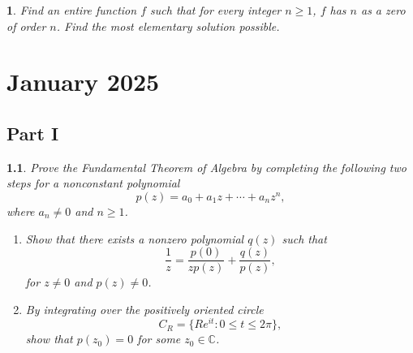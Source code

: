 \documentclass[12pt, a4paper]{report}
\theoremstyle{spaced}
\newtheorem{exercise}{}
\begin{document}
\begin{exercise}
	Find an entire function \(f\) such that for every integer \(n\ge 1\), \(f\) has
	\(n\) as a zero of order \(n\). Find the most elementary solution possible.
\end{exercise}

\chapter{January 2025}

\section{Part I}
\begin{exercise}
	Prove the Fundamental Theorem of Algebra by completing the following two
	steps for a nonconstant polynomial
	\[
		p(z)=a_0+a_1z+\cdots+a_nz^n,
	\]
	where \(a_n\neq 0\) and \(n\geq 1\).

	\begin{enumerate}
		\item[(a)] Show that there exists a nonzero polynomial \(q(z)\) such that
			\[
				\frac{1}{z}
				=
				\frac{p(0)}{zp(z)}
				+
				\frac{q(z)}{p(z)},
			\]
			for \(z\neq 0\) and \(p(z)\neq 0\).

		\item[(b)] By integrating over the positively oriented circle
			\[
				C_R=\{Re^{it}:0\leq t\leq 2\pi\},
			\]
			show that \(p(z_0)=0\) for some \(z_0\in\mathbb{C}\).
	\end{enumerate}
\end{exercise}
\end{document}
